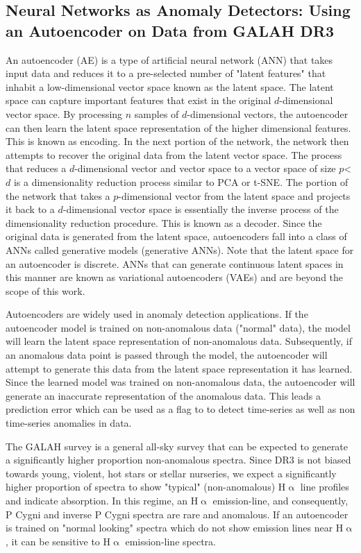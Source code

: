 \subsection{Neural Networks as Anomaly Detectors: Using an Autoencoder on Data from GALAH DR3}

An autoencoder (AE) is a type of artificial neural network (ANN) that takes input data and reduces it to a pre-selected number of "latent features" that inhabit a low-dimensional vector space known as the latent space. The latent space can capture important features that exist in the original $d$-dimensional vector space. By processing $n$ samples of $d$-dimensional vectors, the autoencoder can then learn the latent space representation of the higher dimensional features. This is known as encoding. In the next portion of the network, the network then attempts to recover the original data from the latent vector space. The process that reduces a $d$-dimensional vector and vector space to a vector space of size $p$<$d$ is a dimensionality reduction process similar to PCA or t-SNE. The portion of the network that takes a $p$-dimensional vector from the latent space and projects it back to a $d$-dimensional vector space is essentially the inverse process of the dimensionality reduction procedure. This is known as a decoder. Since the original data is generated from the latent space, autoencoders fall into a class of ANNs called generative models (generative ANNs). Note that the latent space for an autoencoder is discrete. ANNs that can generate continuous latent spaces in this manner are known as variational autoencoders (VAEs) and are beyond the scope of this work. 

Autoencoders are widely used in anomaly detection applications\cite{sakurada2014anomaly}. If the autoencoder model is trained on non-anomalous data ("normal" data), the model will learn the latent space representation of non-anomalous data. Subsequently, if an anomalous data point is passed through the model, the autoencoder will attempt to generate this data from the latent space representation it has learned. Since the learned model was trained on non-anomalous data, the autoencoder will generate an inaccurate representation of the anomalous data. This leads a prediction error which can be used as a flag to to detect time-series as well as non time-series anomalies in data.

The GALAH survey is a general all-sky survey that can be expected to generate a significantly higher proportion non-anomalous spectra. Since DR3 is not biased towards young, violent, hot stars or stellar nurseries, we expect a significantly higher proportion of spectra to show "typical" (non-anomalous) H$\upalpha$ line profiles and indicate absorption. In this regime, an H$\upalpha$ emission-line, and consequently, P Cygni and inverse P Cygni spectra are rare and anomalous. If an autoencoder is trained on "normal looking" spectra which do not show emission lines near H$\upalpha$, it can be sensitive to H$\upalpha$ emission-line spectra. 

